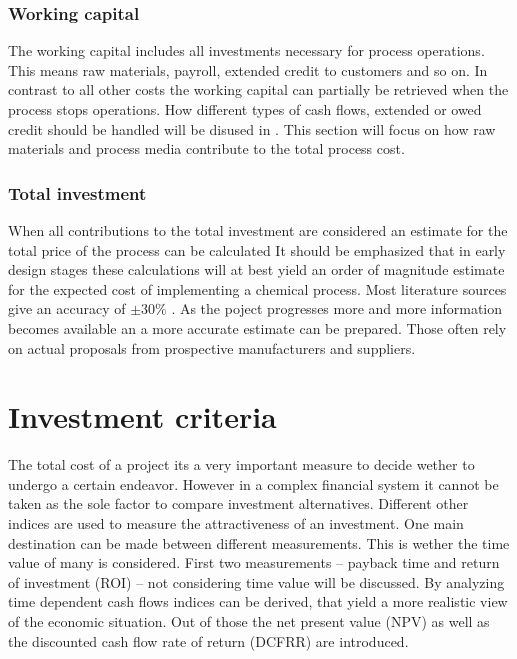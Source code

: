 \subsubsection{Working capital}
The working capital includes all investments necessary for process operations. This means raw
materials, payroll, extended credit to customers and so on. In contrast to all other costs the 
working capital can partially be retrieved when the process stops operations. How different 
types of cash flows, extended or owed credit should be handled will be disused in 
. This section will focus on how raw materials and process media 
contribute to the total process cost. 

\subsubsection{Total investment}
When all contributions to the total investment are considered an estimate for the total price of the 
process can be calculated
%
It should be emphasized that in early design stages these calculations will at best yield an order of
magnitude estimate for the expected cost of implementing a chemical process. Most literature sources 
give an accuracy of $\pm 30 \%$  \cite{Peters.2003}. As the poject progresses more and more information 
becomes available an a more accurate estimate can be prepared. Those often rely on actual proposals
from prospective manufacturers and suppliers. 


\section{Investment criteria}
\label{sec:InvestmentCriteria}
The total cost of a project its a very important measure to decide wether to undergo a certain endeavor. 
However in a complex financial system it cannot be taken as the sole factor to compare investment 
alternatives. Different other indices are used to measure the attractiveness of an investment. One 
main destination can be made between different measurements. This is wether the time value of many
is considered. First two measurements -- payback time and return of investment (ROI) -- not considering time 
value will be discussed. By analyzing time dependent cash flows indices can be derived, that yield a more 
realistic view of the economic situation. Out of those the net present value (NPV) as well as the 
discounted cash flow rate of return (DCFRR) are introduced. 

